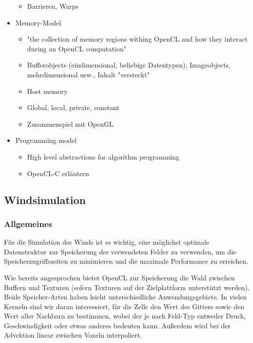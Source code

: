 \begin{itemize}
\begin{itemize}
		\item Barrieren, Warps
	\end{itemize}
\item Memory-Model
	\begin{itemize}
		\item "the collection of memory regions withing OpenCL and how they interact during an OpenCL computation"
		\item Bufferobjects (eindimensional, beliebige Datentypen), Imageobjects, mehrdimensional usw., Inhalt "versteckt"
		\item Host memory
		\item Global, local, private, constant
		\item Zusammenspiel mit OpenGL
	\end{itemize}
\item Programming model
\begin{itemize}
	\item High level abstractions for algorithm programming
	\item OpenCL-C erläutern
\end{itemize}
\end{itemize}

\subsection{Windsimulation}

\subsubsection{Allgemeines}

Für die Simulation des Winds ist es wichtig, eine möglichst optimale
Datenstruktur zur Speicherung der verwendeten Felder zu verwenden, um
die Speicherzugriffszeiten zu minimieren und die maximale Performance zu
erreichen.

Wie bereits angesprochen bietet OpenCL zur Speicherung die Wahl zwischen Buffern
und Texturen (sofern Texturen auf der Zielplattform unterstützt werden). Beide
Speicher-Arten haben leicht unterschiedliche Anwendungsgebiete. In vielen
Kerneln sind wir daran interessiert, für die  Zelle den
Wert des Gitters sowie den Wert aller Nachbarn zu bestimmen, wobei der
 je nach Feld-Typ entweder Druck, Geschwindigkeit oder etwas
anderes bedeuten kann. Außerdem wird bei der Advektion linear zwischen Voxeln
interpoliert.

